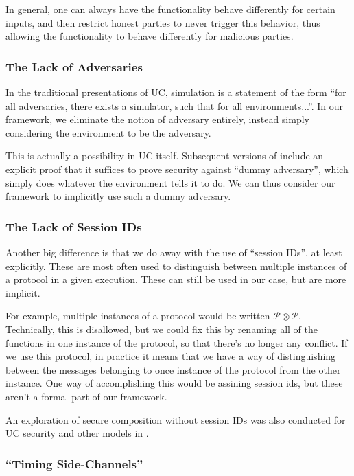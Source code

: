 In general, one can always have the functionality
behave differently for certain inputs,
and then restrict honest parties to never trigger this behavior,
thus allowing the functionality to behave differently
for malicious parties.

\subsubsection*{The Lack of Adversaries}

In the traditional presentations of UC,
simulation is a statement of the form ``for all adversaries,
there exists a simulator, such that for all environments...''.
In our framework, we eliminate the notion of adversary
entirely, instead simply considering the environment
to be the adversary.

This is actually a possibility in UC itself.
Subsequent versions of \cite{EPRINT:Canetti00} include
an explicit proof that it suffices to prove security against ``dummy adversary'',
which simply does whatever the environment tells it to do.
We can thus consider our framework to implicitly use such a dummy adversary.

\subsubsection*{The Lack of Session IDs}

Another big difference is that we do away with the use of ``session IDs'',
at least explicitly.
These are most often used to distinguish between multiple
instances of a protocol in a given execution.
These can still be used in our case, but are more implicit.

For example, multiple instances of a protocol would be written
$\mathscr{P} \otimes \mathscr{P}$.
Technically, this is disallowed, but we could fix this
by renaming all of the functions in one instance of the protocol,
so that there's no longer any conflict.
If we use this protocol, in practice it means that we
have a way of distinguishing between the messages belonging
to once instance of the protocol from the other instance.
One way of accomplishing this would be assining session ids,
but these aren't a formal part of our framework.

An exploration of secure composition without session IDs
was also conducted for UC security and other models
in \cite{CCS:KusTue11}.

\subsubsection*{``Timing Side-Channels''}

